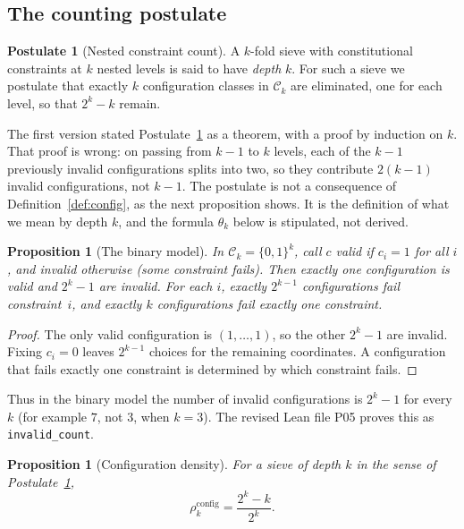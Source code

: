 \documentclass[12pt]{amsart}
\theoremstyle{plain}
\newtheorem{proposition}[theorem]{Proposition}
\theoremstyle{definition}
\newtheorem{postulate}[theorem]{Postulate}
\theoremstyle{remark}
\newcommand{\thetak}{\theta_k}
\newcommand{\rhoc}{\rho^{\mathrm{config}}}
\begin{document}
\subsection{The counting postulate}

\begin{postulate}[Nested constraint count]
\label{post:count}
A $k$-fold sieve with constitutional constraints at $k$ nested levels is said to
have \emph{depth} $k$. For such a sieve we postulate that exactly $k$
configuration classes in $\mathcal{C}_k$ are eliminated, one for each level, so
that $2^k - k$ remain.
\end{postulate}

The first version stated Postulate~\ref{post:count} as a theorem, with a proof by
induction on $k$. That proof is wrong: on passing from $k-1$ to $k$ levels, each
of the $k-1$ previously invalid configurations splits into two, so they
contribute $2(k-1)$ invalid configurations, not $k-1$. The postulate is not a
consequence of Definition~\ref{def:config}, as the next proposition shows. It is
the definition of what we mean by depth $k$, and the formula $\thetak$ below is
stipulated, not derived.

\begin{proposition}[The binary model]
\label{prop:binary}
In $\mathcal{C}_k = \{0,1\}^k$, call $c$ \emph{valid} if $c_i = 1$ for all $i$,
and \emph{invalid} otherwise (some constraint fails). Then exactly one
configuration is valid and $2^k - 1$ are invalid. For each $i$, exactly
$2^{k-1}$ configurations fail constraint~$i$, and exactly $k$ configurations fail
exactly one constraint.
\end{proposition}

\begin{proof}
The only valid configuration is $(1, \ldots, 1)$, so the other $2^k - 1$ are
invalid. Fixing $c_i = 0$ leaves $2^{k-1}$ choices for the remaining coordinates.
A configuration that fails exactly one constraint is determined by which
constraint fails.
\end{proof}

Thus in the binary model the number of invalid configurations is $2^k - 1$ for
every $k$ (for example $7$, not $3$, when $k = 3$). The revised Lean file P05
proves this as \texttt{invalid\_count}.

\begin{proposition}[Configuration density]
\label{prop:density}
For a sieve of depth $k$ in the sense of Postulate~\ref{post:count},
\[
  \rhoc_k = \frac{2^k - k}{2^k}.
\]
\end{proposition}
\end{document}
